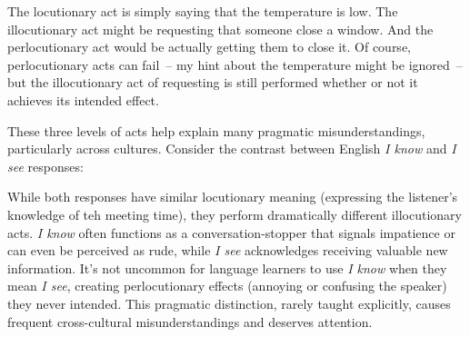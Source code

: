 The locutionary act is simply saying that the temperature is low. The illocutionary act might be requesting that someone close a window. And the perlocutionary act would be actually getting them to close it. Of course, perlocutionary acts can fail~-- my hint about the temperature might be ignored~-- but the illocutionary act of requesting is still performed whether or not it achieves its intended effect.

These three levels of acts help explain many pragmatic misunderstandings, particularly across cultures. Consider the contrast between English \textit{I know} and \textit{I see} responses:

\z
\z
While both responses have similar locutionary meaning (expressing the listener's knowledge of teh meeting time), they perform dramatically different illocutionary acts. \textit{I know} often functions as a conversation-stopper that signals impatience or can even be perceived as rude, while \textit{I see} acknowledges receiving valuable new information. It's not uncommon for language learners to use \textit{I know} when they mean \textit{I see}, creating perlocutionary effects (annoying or confusing the speaker) they never intended. This pragmatic distinction, rarely taught explicitly, causes frequent cross-cultural misunderstandings and deserves attention.


